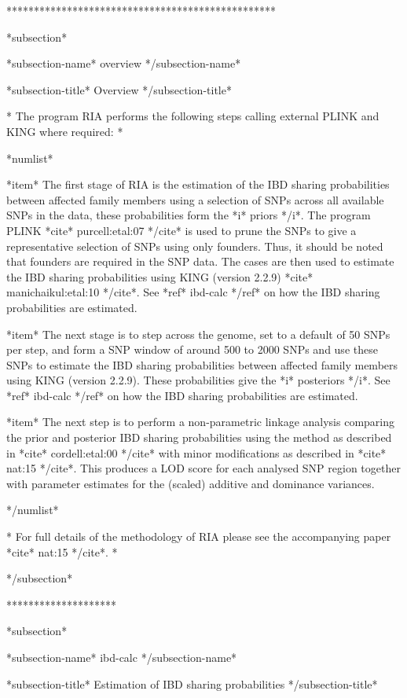 *************************************************


*subsection*

*subsection-name*
overview
*/subsection-name*

*subsection-title*
Overview
*/subsection-title*

*
The program RIA performs the following steps calling external PLINK and KING where required:
*

*numlist*

*item*
The first stage of RIA is the estimation of the IBD sharing probabilities between affected family members using a selection of SNPs across all available SNPs in the data, these probabilities form the *i* priors */i*. The program PLINK *cite* purcell:etal:07 */cite* is used to prune the SNPs to give a representative selection of SNPs using only founders. Thus, it should be noted that founders are required in the SNP data. The cases are then used to estimate the IBD sharing probabilities using KING (version 2.2.9) *cite* manichaikul:etal:10 */cite*. See *ref* ibd-calc */ref* on how the IBD sharing probabilities are estimated.

*item*
The next stage is to step across the genome, set to a default of 50 SNPs per step, and form a SNP window of around 500 to 2000 SNPs and use these SNPs to estimate the IBD sharing probabilities between affected family members using KING (version 2.2.9). These probabilities give the *i* posteriors */i*. See *ref* ibd-calc */ref* on how the IBD sharing probabilities are estimated.

*item*
The next step is to perform a non-parametric linkage analysis comparing the prior and posterior IBD sharing probabilities using the method as described in *cite* cordell:etal:00 */cite* with minor modifications as described in *cite* nat:15 */cite*. This produces a LOD score for each analysed SNP region together with parameter estimates for the (scaled) additive and dominance variances.

*/numlist*


*
For full details of the methodology of RIA please see the accompanying paper *cite* nat:15 */cite*.
*

*/subsection*


********************


*subsection*

*subsection-name*
ibd-calc
*/subsection-name*

*subsection-title*
Estimation of IBD sharing probabilities
*/subsection-title*

